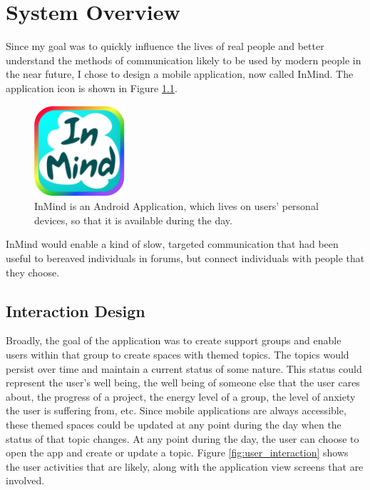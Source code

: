 \chapter{System Overview}
  Since my goal was to quickly influence the lives of real people
  and better understand the methods of communication likely to be used by
  modern people in the near future, I chose to design
  a mobile application, now called InMind.
  The application icon is shown in Figure \ref{fig:application_icon}.

  \begin{figure}
  \centering
  \includegraphics[width=0.3\textwidth]{inmind_logo2.png}
  \caption[InMind icon]{InMind is an Android Application,
  which lives on users' personal devices,
  so that it is available during the day.}
  \label{fig:application_icon}
  \end{figure}

  InMind would enable a kind of slow,
  targeted communication that had been useful to bereaved individuals in forums,
  but connect individuals with people that they choose.

  \section{Interaction Design}
  Broadly, the goal of the application was to create support groups and 
  enable users within that group to create spaces
  with themed topics.
  The topics would persist over time and maintain a current status of some nature.
  This status could represent the user's well being, the well being of someone else
  that the user cares about, the progress of a project, the energy level of a group,
  the level of anxiety the user is suffering from, etc.
  Since mobile applications are always accessible,
  these themed spaces could be updated at any point
  during the day when the status of that topic changes.
  At any point during the day,
  the user can choose to open the app and create or update a topic.
  Figure \ref{fig:user_interaction} shows the user activities
  that are likely, along with the application view screens that are involved.
 
